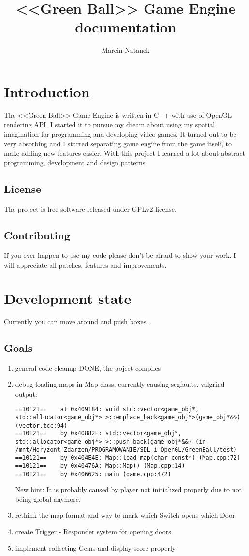 \documentclass[11pt,a4paper,oneside]{report}
\title{<<Green Ball>> Game Engine documentation}
\author{Marcin Natanek}
\begin{document}
\maketitle
\pagebreak
\tableofcontents
\pagebreak

\chapter{Introduction}
The <<Green Ball>> Game Engine is written in C++ with use of OpenGL rendering API. I started it to pursue my dream about using my spatial imagination for programming and developing video games. It turned out to be very absorbing and I started separating game engine from the game itself, to make adding new features easier. With this project I learned a lot about abstract programming, development and design patterns.

\section{License}
The project is free software released under GPLv2 license.

\section{Contributing}
If you ever happen to use my code please don't be afraid to show your work. I will appreciate all patches, features and improvements.

\chapter{Development state}
Currently you can move around and push boxes.
\section{Goals}
\begin{enumerate}
	\item \st{general code cleanup DONE, the poject compiles}
	\item debug loading maps in Map class, currently causing segfaults. valgrind output:
		\begin{lstlisting}
==10121==    at 0x409184: void std::vector<game_obj*, std::allocator<game_obj*> >::emplace_back<game_obj*>(game_obj*&&) (vector.tcc:94)
==10121==    by 0x40882F: std::vector<game_obj*, std::allocator<game_obj*> >::push_back(game_obj*&&) (in /mnt/Horyzont Zdarzen/PROGRAMOWANIE/SDL i OpenGL/GreenBall/test)
==10121==    by 0x404E4E: Map::load_map(char const*) (Map.cpp:72)
==10121==    by 0x40476A: Map::Map() (Map.cpp:14)
==10121==    by 0x406625: main (game.cpp:472)
		\end{lstlisting}
		New hint: It is probably caused by player not initialized properly due to not being global anymore.
	\item rethink the map format and way to mark which Switch opens which Door
	\item create Trigger - Responder system for opening doors
	\item implement collecting Gems and display score properly
\end{enumerate}
\end{document}
